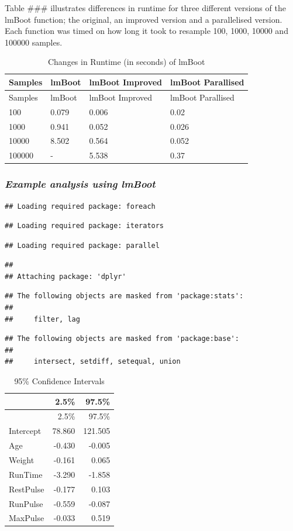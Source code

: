 \documentclass[]{article}
\begin{document}
Table \#\#\# illustrates differences in runtime for three different
versions of the lmBoot function; the original, an improved version and a
parallelised version. Each function was timed on how long it took to
resample 100, 1000, 10000 and 100000 samples.

\begin{longtable}[]{@{}llll@{}}
\caption{Changes in Runtime (in seconds) of lmBoot}\tabularnewline
\toprule
Samples & lmBoot & lmBoot Improved & lmBoot Parallised\tabularnewline
\midrule
\endfirsthead
\toprule
Samples & lmBoot & lmBoot Improved & lmBoot Parallised\tabularnewline
\midrule
\endhead
100 & 0.079 & 0.006 & 0.02\tabularnewline
1000 & 0.941 & 0.052 & 0.026\tabularnewline
10000 & 8.502 & 0.564 & 0.052\tabularnewline
100000 & - & 5.538 & 0.37\tabularnewline
\bottomrule
\end{longtable}

\subsubsection{\texorpdfstring{\emph{Example analysis using
lmBoot}}{Example analysis using lmBoot}}\label{example-analysis-using-lmboot}

\begin{verbatim}
## Loading required package: foreach
\end{verbatim}

\begin{verbatim}
## Loading required package: iterators
\end{verbatim}

\begin{verbatim}
## Loading required package: parallel
\end{verbatim}

\begin{verbatim}
## 
## Attaching package: 'dplyr'
\end{verbatim}

\begin{verbatim}
## The following objects are masked from 'package:stats':
## 
##     filter, lag
\end{verbatim}

\begin{verbatim}
## The following objects are masked from 'package:base':
## 
##     intersect, setdiff, setequal, union
\end{verbatim}

\begin{longtable}[]{@{}lrr@{}}
\caption{95\% Confidence Intervals}\tabularnewline
\toprule
& 2.5\% & 97.5\%\tabularnewline
\midrule
\endfirsthead
\toprule
& 2.5\% & 97.5\%\tabularnewline
\midrule
\endhead
Intercept & 78.860 & 121.505\tabularnewline
Age & -0.430 & -0.005\tabularnewline
Weight & -0.161 & 0.065\tabularnewline
RunTime & -3.290 & -1.858\tabularnewline
RestPulse & -0.177 & 0.103\tabularnewline
RunPulse & -0.559 & -0.087\tabularnewline
MaxPulse & -0.033 & 0.519\tabularnewline
\bottomrule
\end{longtable}
\end{document}

